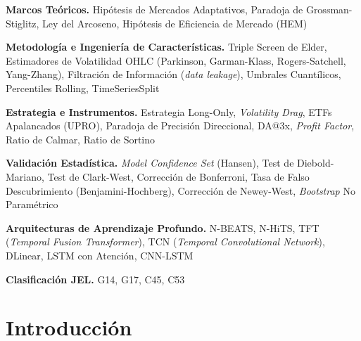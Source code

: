 ﻿\documentclass[11pt,a4paper]{article}
\begin{document}
\vspace{0.5cm}

\textbf{Marcos Te\'oricos.} Hip\'otesis de Mercados Adaptativos, Paradoja de Grossman-Stiglitz, Ley del Arcoseno, Hip\'otesis de Eficiencia de Mercado (HEM)

\vspace{0.3cm}

\textbf{Metodolog\'ia e Ingenier\'ia de Caracter\'isticas.} Triple Screen de Elder, Estimadores de Volatilidad OHLC (Parkinson, Garman-Klass, Rogers-Satchell, Yang-Zhang), Filtraci\'on de Informaci\'on (\textit{data leakage}), Umbrales Cuant\'ilicos, Percentiles Rolling, TimeSeriesSplit

\vspace{0.3cm}

\textbf{Estrategia e Instrumentos.} Estrategia Long-Only, \textit{Volatility Drag}, ETFs Apalancados (UPRO), Paradoja de Precisi\'on Direccional, DA@3x, \textit{Profit Factor}, Ratio de Calmar, Ratio de Sortino

\vspace{0.3cm}

\textbf{Validaci\'on Estad\'istica.} \textit{Model Confidence Set} (Hansen), Test de Diebold-Mariano, Test de Clark-West, Correcci\'on de Bonferroni, Tasa de Falso Descubrimiento (Benjamini-Hochberg), Correcci\'on de Newey-West, \textit{Bootstrap} No Param\'etrico

\vspace{0.3cm}

\textbf{Arquitecturas de Aprendizaje Profundo.} N-BEATS, N-HiTS, TFT (\textit{Temporal Fusion Transformer}), TCN (\textit{Temporal Convolutional Network}), DLinear, LSTM con Atenci\'on, CNN-LSTM

\vspace{0.8cm}

\textbf{Clasificaci\'on JEL.} G14, G17, C45, C53

\vspace{0.5cm}

\newpage
\tableofcontents
\newpage

\section{Introducci\'on}
\end{document}

